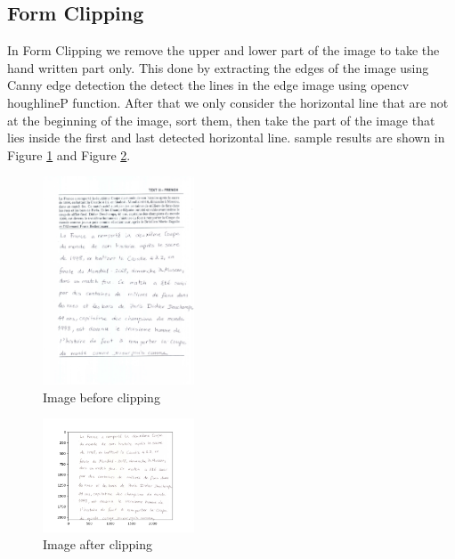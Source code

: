 \subsection{Form Clipping}
In Form Clipping we remove the upper and lower part of the image to take the hand written part only.
This done by extracting the edges of the image using Canny edge detection the detect the lines in the edge image using opencv houghlineP function.
After that we only consider the horizontal line that are not at the beginning of the image, sort them, then take the part of the image that lies inside the first and last detected horizontal line.
sample results are shown in Figure \ref{fig:clipping-example} and Figure \ref{fig:clipping-result}.

\begin{figure}[h!]
    \centering
    \includegraphics[width=0.4\textwidth]{source/images/5.jpeg}
    \caption{Image before clipping}
    \label{fig:clipping-example}
\end{figure}

\begin{figure}[h!]
    \centering
    \includegraphics[width=0.4\textwidth]{source/images/img5_result.png}
    \caption{Image after clipping}
    \label{fig:clipping-result}
\end{figure}